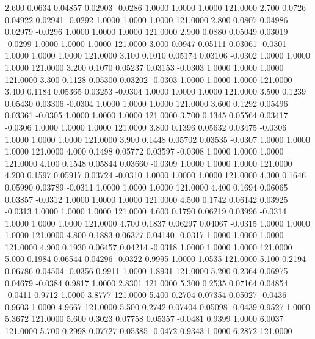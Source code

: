    2.600   0.0634   0.04857   0.02903  -0.0286   1.0000   1.0000   1.0000 121.0000
   2.700   0.0726   0.04922   0.02941  -0.0292   1.0000   1.0000   1.0000 121.0000
   2.800   0.0807   0.04986   0.02979  -0.0296   1.0000   1.0000   1.0000 121.0000
   2.900   0.0880   0.05049   0.03019  -0.0299   1.0000   1.0000   1.0000 121.0000
   3.000   0.0947   0.05111   0.03061  -0.0301   1.0000   1.0000   1.0000 121.0000
   3.100   0.1010   0.05174   0.03106  -0.0302   1.0000   1.0000   1.0000 121.0000
   3.200   0.1070   0.05237   0.03153  -0.0303   1.0000   1.0000   1.0000 121.0000
   3.300   0.1128   0.05300   0.03202  -0.0303   1.0000   1.0000   1.0000 121.0000
   3.400   0.1184   0.05365   0.03253  -0.0304   1.0000   1.0000   1.0000 121.0000
   3.500   0.1239   0.05430   0.03306  -0.0304   1.0000   1.0000   1.0000 121.0000
   3.600   0.1292   0.05496   0.03361  -0.0305   1.0000   1.0000   1.0000 121.0000
   3.700   0.1345   0.05564   0.03417  -0.0306   1.0000   1.0000   1.0000 121.0000
   3.800   0.1396   0.05632   0.03475  -0.0306   1.0000   1.0000   1.0000 121.0000
   3.900   0.1448   0.05702   0.03535  -0.0307   1.0000   1.0000   1.0000 121.0000
   4.000   0.1498   0.05772   0.03597  -0.0308   1.0000   1.0000   1.0000 121.0000
   4.100   0.1548   0.05844   0.03660  -0.0309   1.0000   1.0000   1.0000 121.0000
   4.200   0.1597   0.05917   0.03724  -0.0310   1.0000   1.0000   1.0000 121.0000
   4.300   0.1646   0.05990   0.03789  -0.0311   1.0000   1.0000   1.0000 121.0000
   4.400   0.1694   0.06065   0.03857  -0.0312   1.0000   1.0000   1.0000 121.0000
   4.500   0.1742   0.06142   0.03925  -0.0313   1.0000   1.0000   1.0000 121.0000
   4.600   0.1790   0.06219   0.03996  -0.0314   1.0000   1.0000   1.0000 121.0000
   4.700   0.1837   0.06297   0.04067  -0.0315   1.0000   1.0000   1.0000 121.0000
   4.800   0.1883   0.06377   0.04140  -0.0317   1.0000   1.0000   1.0000 121.0000
   4.900   0.1930   0.06457   0.04214  -0.0318   1.0000   1.0000   1.0000 121.0000
   5.000   0.1984   0.06544   0.04296  -0.0322   0.9995   1.0000   1.0535 121.0000
   5.100   0.2194   0.06786   0.04504  -0.0356   0.9911   1.0000   1.8931 121.0000
   5.200   0.2364   0.06975   0.04679  -0.0384   0.9817   1.0000   2.8301 121.0000
   5.300   0.2535   0.07164   0.04854  -0.0411   0.9712   1.0000   3.8777 121.0000
   5.400   0.2704   0.07354   0.05027  -0.0436   0.9603   1.0000   4.9667 121.0000
   5.500   0.2742   0.07404   0.05098  -0.0439   0.9527   1.0000   5.3672 121.0000
   5.600   0.3023   0.07758   0.05357  -0.0481   0.9399   1.0000   6.0037 121.0000
   5.700   0.2998   0.07727   0.05385  -0.0472   0.9343   1.0000   6.2872 121.0000
